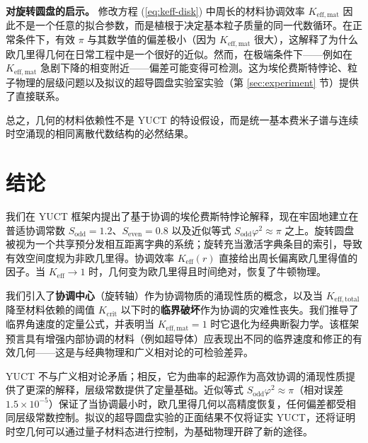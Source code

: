\documentclass[12pt,a4paper]{article}
\newcommand{\Sodd}{S_{\mathrm{odd}}}
\newcommand{\Seven}{S_{\mathrm{even}}}
\begin{document}
	\textbf{对旋转圆盘的启示。} 修改方程 (\ref{eq:keff-disk}) 中周长的材料协调效率 \(K_{\mathrm{eff,mat}}\) 因此不是一个任意的拟合参数，而是植根于决定基本粒子质量的同一代数循环。在正常条件下，有效 \(\pi\) 与其数学值的偏差极小（因为 \(K_{\mathrm{eff,mat}}\) 很大），这解释了为什么欧几里得几何在日常工程中是一个很好的近似。然而，在极端条件下——例如在 \(K_{\mathrm{eff,mat}}\) 急剧下降的相变附近——偏差可能变得可检测。这为埃伦费斯特悖论、粒子物理的层级问题以及拟议的超导圆盘实验室实验（第 \ref{sec:experiment} 节）提供了直接联系。
	
	总之，几何的材料依赖性不是 YUCT 的特设假设，而是统一基本费米子谱与连续时空涌现的相同离散代数结构的必然结果。
	
	\section{结论}
	\label{sec:conclusion}
	
	我们在 YUCT 框架内提出了基于协调的埃伦费斯特悖论解释，现在牢固地建立在普适协调常数 \(\Sodd = 1.2\)、\(\Seven = 0.8\) 以及近似等式 \(\Sodd \varphi^2 \approx \pi\) 之上。旋转圆盘被视为一个共享预分发相互距离字典的系统；旋转充当激活字典条目的索引，导致有效空间度规为非欧几里得。协调效率 \(K_{\mathrm{eff}}(r)\) 直接给出周长偏离欧几里得值的因子。当 \(K_{\mathrm{eff}} \to 1\) 时，几何变为欧几里得且时间绝对，恢复了牛顿物理。
	
	我们引入了\textbf{协调中心}（旋转轴）作为协调物质的涌现性质的概念，以及当 \(K_{\mathrm{eff,total}}\) 降至材料依赖的阈值 \(K_{\mathrm{crit}}\) 以下时的\textbf{临界破坏}作为协调的灾难性丧失。我们推导了临界角速度的定量公式，并表明当 \(K_{\mathrm{eff,mat}}=1\) 时它退化为经典断裂力学。该框架预言具有增强内部协调的材料（例如超导体）应表现出不同的临界速度和修正的有效几何——这是与经典物理和广义相对论的可检验差异。
	
	YUCT 不与广义相对论矛盾；相反，它为曲率的起源作为高效协调的涌现性质提供了更深的解释，层级常数提供了定量基础。近似等式 \(\Sodd \varphi^2 \approx \pi\)（相对误差 \(1.5\times10^{-5}\)）保证了当协调最小时，欧几里得几何以高精度恢复，任何偏差都受相同层级常数控制。拟议的超导圆盘实验的正面结果不仅将证实 YUCT，还将证明时空几何可以通过量子材料态进行控制，为基础物理开辟了新的途径。
	
\end{document}
